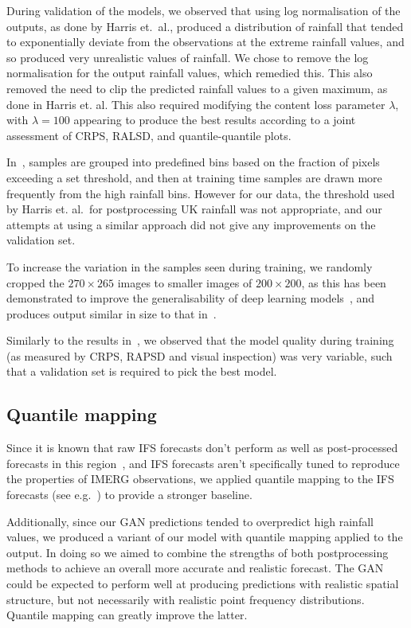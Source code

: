 \documentclass{article}
\begin{document}
During validation of the models, we observed that using log normalisation of the outputs, as done by Harris et.~al., produced a distribution of rainfall that tended to exponentially deviate from the observations at the extreme rainfall values, and so produced very unrealistic values of rainfall. We chose to remove the log normalisation for the output rainfall values, which remedied this. This also removed the need to clip the predicted rainfall values to a given maximum, as done in Harris et. al. This also required modifying the content loss parameter $\lambda$, with $\lambda=100$ appearing to produce the best results according to a joint assessment of CRPS, RALSD, and quantile-quantile plots.

In~\cite{harris_generative_2022}, samples are grouped into predefined bins based on the fraction of pixels exceeding a set threshold, and then at training time samples are drawn more frequently from the high rainfall bins. However for our data, the threshold used by Harris et. al.~for postprocessing UK rainfall was not appropriate, and our attempts at using a similar approach did not give any improvements on the validation set.


To increase the variation in the samples seen during training, we randomly cropped the $270 \times 265$ images to smaller images of $200 \times 200$, as this has been demonstrated to improve the generalisability of deep learning models~\citep{goodfellow_deep_2016}, and produces output similar in size to that in~\cite{harris_generative_2022}.


Similarly to the results in~\cite{harris_generative_2022}, we observed that the model quality during training (as measured by CRPS, RAPSD and visual inspection) was very variable, such that a validation set is required to pick the best model. 

\subsection{Quantile mapping}
\label{subsec:qm}
Since it is known that raw IFS forecasts don't perform as well as post-processed forecasts in this region~\citep{vogel_skill_2018}, and IFS forecasts aren't specifically tuned to reproduce the properties of IMERG observations, we applied quantile mapping to the IFS forecasts (see e.g.~\cite{maraun_model_2017}) to provide a stronger baseline. 

Additionally, since our GAN predictions tended to overpredict high rainfall values, we produced a variant of our model with quantile mapping applied to the output. In doing so we aimed to combine the strengths of both postprocessing methods to achieve an overall more accurate and realistic forecast. The GAN could be expected to perform well at producing predictions with realistic spatial structure, but not necessarily with realistic point frequency distributions. Quantile mapping can greatly improve the latter.
\end{document}
